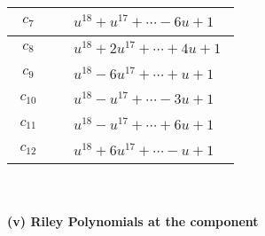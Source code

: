 \documentclass[1p]{elsarticle_modified}
\theoremstyle{definition}
\begin{document}
\begin{tabular}{m{50pt}|m{274pt}}
\hline $$\begin{aligned}c_{7}\end{aligned}$$&$\begin{aligned}
&u^{18}+u^{17}+\cdots-6 u+1
\end{aligned}$\\
\hline $$\begin{aligned}c_{8}\end{aligned}$$&$\begin{aligned}
&u^{18}+2 u^{17}+\cdots+4 u+1
\end{aligned}$\\
\hline $$\begin{aligned}c_{9}\end{aligned}$$&$\begin{aligned}
&u^{18}-6 u^{17}+\cdots+u+1
\end{aligned}$\\
\hline $$\begin{aligned}c_{10}\end{aligned}$$&$\begin{aligned}
&u^{18}- u^{17}+\cdots-3 u+1
\end{aligned}$\\
\hline $$\begin{aligned}c_{11}\end{aligned}$$&$\begin{aligned}
&u^{18}- u^{17}+\cdots+6 u+1
\end{aligned}$\\
\hline $$\begin{aligned}c_{12}\end{aligned}$$&$\begin{aligned}
&u^{18}+6 u^{17}+\cdots- u+1
\end{aligned}$\\
\hline
\end{tabular}\\~\\
\newpage\renewcommand{\arraystretch}{1}
\flushleft \textbf{(v) Riley Polynomials at the component}\newline \\
\end{document}
